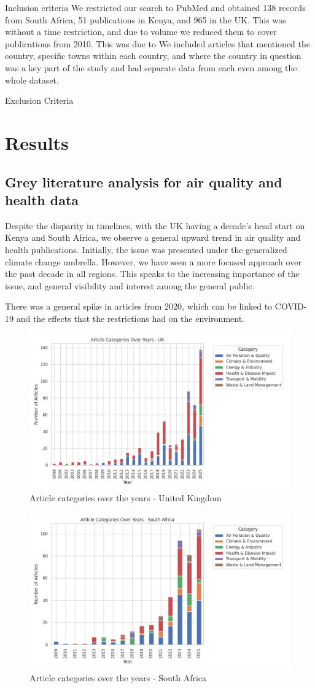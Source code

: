 \documentclass{article}
\begin{document}
Inclusion criteria
We restricted our search to PubMed and obtained 138 records from South Africa, 51 publications in Kenya, and 965 in the UK. This was without a time restriction, and due to volume we reduced them to cover publications from 2010. This was due to 
We included articles that mentioned the country, specific towns within each country, and where the country in question was a key part of the study and had separate data from each even among the whole dataset.

Exclusion Criteria



\section{Results}

\subsection{Grey literature analysis for air quality and health data}

Despite the disparity in timelines, with the UK having a decade's head start on Kenya and South Africa, we observe a general upward trend in air quality and health publications. Initially, the issue was presented under the generalized climate change umbrella. However, we have seen a more focused approach over the past decade in all regions. This speaks to the increasing importance of the issue, and general visibility and interest among the general public. 

There was a general spike in articles from 2020, which can be linked to COVID-19 and the effects that the restrictions had on the environment.

\begin{figure}
    \centering
    \includegraphics[width=0.5\linewidth]{uk_stacked_bar (1).png}
    \caption{Article categories over the years - United Kingdom}
    \label{fig:placeholder}
\end{figure}

\begin{figure}
    \centering
    \includegraphics[width=0.5\linewidth]{south_africa_stacked_bar (1).png}
    \caption{Article categories over the years - South Africa}
    \label{fig:placeholder}
\end{figure}
\end{document}

